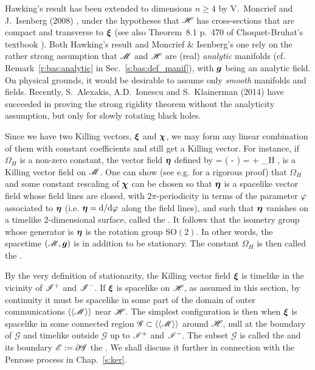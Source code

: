 Hawking's result has been extended to dimensions $n\geq 4$ by V.~Moncrief
and J.~Isenberg (2008) \cite{MoncrI08}, under the hypotheses that $\mathscr{H}$
has cross-sections that are compact and transverse to $\bm{\xi}$ (see also
Theorem~8.1 p.~470 of Choquet-Bruhat's textbook \cite{Choqu09}).
Both Hawking's result
and Moncrief \& Isenberg's one rely on the rather strong assumption that $\mathscr{M}$ and $\mathscr{H}$
are (real) \emph{analytic} manifolds (cf. Remark~\ref{r:bas:analytic} in Sec.~\ref{s:bas:def_manif}),
with $\bm{g}$ being an analytic field. On physical grounds,
it would be desirable to assume only \emph{smooth} manifolds and fields.
Recently, S.~Alexakis, A.D.~Ionescu and S.~Klainerman \cite{AlexaIK14} (2014)
have succeeded in proving the strong rigidity theorem without the analyticity
assumption, but only for slowly rotating black holes.

Since we have two Killing vectors, $\bm{\xi}$ and $\bm{\chi}$, we may
form any linear combination of them with constant coefficients
and still get a Killing vector. For instance, if $\Omega_H$ is a non-zero constant,
the vector field $\bm{\eta}$ defined by
\be
    \w{\eta} =  \left( \w{\chi} - \w{\xi} \right)
    \quad\iff\quad
    \w{\chi} = \w{\xi} + \Omega_H \w{\eta} ,
\ee
is a Killing vector field on $\mathscr{M}$.
One can show (see e.g. \cite{Chrus97} for a rigorous proof) that $\Omega_H$
and some constant rescaling of $\bm{\chi}$
can be chosen so that $\bm{\eta}$ is a spacelike vector field whose
field lines are closed, with $2\pi$-periodicity in terms of the parameter $\varphi$
associated to $\bm{\eta}$ (i.e. $\bm{\eta} = \mathrm{d}/\mathrm{d}\varphi$ along the field lines),
and such that $\bm{\eta}$ vanishes on a timelike 2-dimensional surface, called
the .
It follows that
the isometry group whose generator is $\bm{\eta}$ is the rotation group
$\mathrm{SO}(2)$. In other words, the spacetime $(\mathscr{M},\bm{g})$ is
 in addition to be stationary.
The constant $\Omega_H$ is then called the
.

By the very definition of stationarity, the Killing vector field $\bm{\xi}$ is
timelike in the vicinity of $\mathscr{I}^+$ and $\mathscr{I}^-$. If $\bm{\xi}$ is spacelike
on $\mathscr{H}$, as assumed in this section, by continuity it must be spacelike
in some part of the domain of outer communications $\langle\langle \mathscr{M}\rangle\rangle$
near $\mathscr{H}$. The simplest configuration is then when
$\bm{\xi}$ is spacelike in some connected region $\mathscr{G}\subset \langle\langle \mathscr{M}\rangle\rangle$
around $\mathscr{H}$, null at the boundary of $\mathscr{G}$ and timelike outside $\mathscr{G}$
up to $\mathscr{I}^+$ and $\mathscr{I}^-$. The subset $\mathscr{G}$ is
called the  and its boundary $\mathscr{E}:=\partial\mathscr{G}$
the . We shall discuss it further in connection with
the Penrose process in Chap.~\ref{s:ker}.

